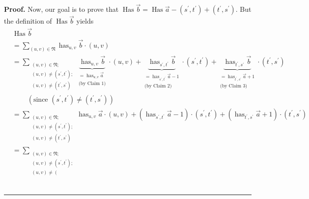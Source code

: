 \documentclass[numbers=enddot,12pt,final,onecolumn,notitlepage,abstracton]{scrartcl}%
\theoremstyle{definition}
\newenvironment{proof}[1][Proof]{\noindent\textbf{#1.} }{\ \rule{0.5em}{0.5em}}
\let\sumnonlimits\sum
\renewcommand{\sum}{\sumnonlimits\limits}
\begin{document}
\begin{proof}
Now, our goal is to prove that $\operatorname*{Has}\overrightarrow{b}%
=\operatorname*{Has}\overrightarrow{a}-\left(  s^{\prime},t^{\prime}\right)
+\left(  t^{\prime},s^{\prime}\right)  $. But the definition of
$\operatorname*{Has}\overrightarrow{b}$ yields%
\begin{align*}
&  \operatorname*{Has}\overrightarrow{b}\\
&  =\sum_{\left(  u,v\right)  \in\mathfrak{N}}\operatorname*{has}%
\nolimits_{u,v}\overrightarrow{b}\cdot\left(  u,v\right) \\
&  =\sum_{\substack{\left(  u,v\right)  \in\mathfrak{N};\\\left(  u,v\right)
\neq\left(  s^{\prime},t^{\prime}\right)  ;\\\left(  u,v\right)  \neq\left(
t^{\prime},s^{\prime}\right)  }}\underbrace{\operatorname*{has}\nolimits_{u,v}%
\overrightarrow{b}}_{\substack{=\operatorname*{has}\nolimits_{u,v}%
\overrightarrow{a}\\\text{(by Claim 1)}}}\cdot\left(  u,v\right)
+\underbrace{\operatorname*{has}\nolimits_{s^{\prime},t^{\prime}%
}\overrightarrow{b}}_{\substack{=\operatorname*{has}\nolimits_{s^{\prime
},t^{\prime}}\overrightarrow{a}-1\\\text{(by Claim 2)}}}\cdot\left(
s^{\prime},t^{\prime}\right)  +\underbrace{\operatorname*{has}%
\nolimits_{t^{\prime},s^{\prime}}\overrightarrow{b}}%
_{\substack{=\operatorname*{has}\nolimits_{t^{\prime},s^{\prime}%
}\overrightarrow{a}+1\\\text{(by Claim 3)}}}\cdot\left(  t^{\prime},s^{\prime
}\right) \\
&  \ \ \ \ \ \ \ \ \ \ \left(  \text{since }\left(  s^{\prime},t^{\prime
}\right)  \neq\left(  t^{\prime},s^{\prime}\right)  \right) \\
&  =\sum_{\substack{\left(  u,v\right)  \in\mathfrak{N};\\\left(  u,v\right)
\neq\left(  s^{\prime},t^{\prime}\right)  ;\\\left(  u,v\right)  \neq\left(
t^{\prime},s^{\prime}\right)  }}\operatorname*{has}\nolimits_{u,v}%
\overrightarrow{a}\cdot\left(  u,v\right)  +\left(  \operatorname*{has}%
\nolimits_{s^{\prime},t^{\prime}}\overrightarrow{a}-1\right)  \cdot\left(
s^{\prime},t^{\prime}\right)  +\left(  \operatorname*{has}\nolimits_{t^{\prime
},s^{\prime}}\overrightarrow{a}+1\right)  \cdot\left(  t^{\prime},s^{\prime
}\right) \\
&  =\sum_{\substack{\left(  u,v\right)  \in\mathfrak{N};\\\left(  u,v\right)
\neq\left(  s^{\prime},t^{\prime}\right)  ;\\\left(  u,v\right)  \neq\left(
}}
\end{align*}
\end{proof}
\end{document}
